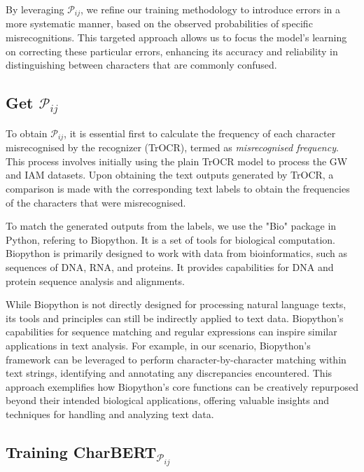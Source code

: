 By leveraging $\mathcal{P}_{ij}$, we refine our training methodology to introduce errors in a more systematic manner, based on the observed probabilities of specific misrecognitions. This targeted approach allows us to focus the model's learning on correcting these particular errors, enhancing its accuracy and reliability in distinguishing between characters that are commonly confused.

\subsection{Get $\mathcal{P}_{ij}$}
\label{subsec:3_get_pij}
To obtain $\mathcal{P}_{ij}$, it is essential first to calculate the frequency of each character misrecognised by the recognizer (TrOCR), termed as \emph{misrecognised frequency}. This process involves initially using the plain TrOCR model to process the GW and IAM datasets. Upon obtaining the text outputs generated by TrOCR, a comparison is made with the corresponding text labels to obtain the frequencies of the characters that were misrecognised.

To match the generated outputs from the labels, we use the "Bio" package in Python, refering to Biopython. It is a set of tools for biological computation. Biopython is primarily designed to work with data from bioinformatics, such as sequences of DNA, RNA, and proteins. It provides capabilities for DNA and protein sequence analysis and alignments.

While Biopython is not directly designed for processing natural language texts, its tools and principles can still be indirectly applied to text data. Biopython's capabilities for sequence matching and regular expressions can inspire similar applications in text analysis. For example, in our scenario, Biopython's framework can be leveraged to perform character-by-character matching within text strings, identifying and annotating any discrepancies encountered. This approach exemplifies how Biopython's core functions can be creatively repurposed beyond their intended biological applications, offering valuable insights and techniques for handling and analyzing text data.

\subsection{Training CharBERT$_{\mathcal{P}_{ij}}$}
\label{subsec:3_training_charbert_pij}